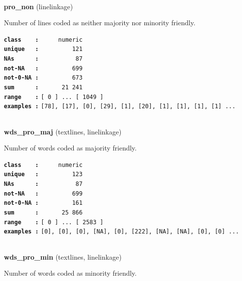 \documentclass[]{article}
\begin{document}
~

\textbf{pro\_non} (linelinkage)

Number of lines coded as neither majority nor minority friendly.

\textbf{\texttt{class\ \ \ \ :}} \texttt{~~~~~numeric}\\
\textbf{\texttt{unique\ \ \ :}} \texttt{~~~~~~~~~121}\\
\textbf{\texttt{NAs\ \ \ \ \ \ :}} \texttt{~~~~~~~~~~87}\\
\textbf{\texttt{not-NA\ \ \ :}} \texttt{~~~~~~~~~699}\\
\textbf{\texttt{not-0-NA\ :}} \texttt{~~~~~~~~~673}\\
\textbf{\texttt{sum\ \ \ \ \ \ :}} \texttt{~~~~~~21~241}\\
\textbf{\texttt{range\ \ \ \ :}}
\texttt{{[}\ 0\ {]}\ ...\ {[}\ 1049\ {]}}\\
\textbf{\texttt{examples\ :}}
\texttt{{[}78{]},\ {[}17{]},\ {[}0{]},\ {[}29{]},\ {[}1{]},\ {[}20{]},\ {[}1{]},\ {[}1{]},\ {[}1{]},\ {[}1{]}\ ...}\\

~

\textbf{wds\_pro\_maj} (textlines, linelinkage)

Number of words coded as majority friendly.

\textbf{\texttt{class\ \ \ \ :}} \texttt{~~~~~numeric}\\
\textbf{\texttt{unique\ \ \ :}} \texttt{~~~~~~~~~123}\\
\textbf{\texttt{NAs\ \ \ \ \ \ :}} \texttt{~~~~~~~~~~87}\\
\textbf{\texttt{not-NA\ \ \ :}} \texttt{~~~~~~~~~699}\\
\textbf{\texttt{not-0-NA\ :}} \texttt{~~~~~~~~~161}\\
\textbf{\texttt{sum\ \ \ \ \ \ :}} \texttt{~~~~~~25~866}\\
\textbf{\texttt{range\ \ \ \ :}}
\texttt{{[}\ 0\ {]}\ ...\ {[}\ 2583\ {]}}\\
\textbf{\texttt{examples\ :}}
\texttt{{[}0{]},\ {[}0{]},\ {[}0{]},\ {[}NA{]},\ {[}0{]},\ {[}222{]},\ {[}NA{]},\ {[}NA{]},\ {[}0{]},\ {[}0{]}\ ...}\\

~

\textbf{wds\_pro\_min} (textlines, linelinkage)

Number of words coded as minority friendly.
\end{document}
